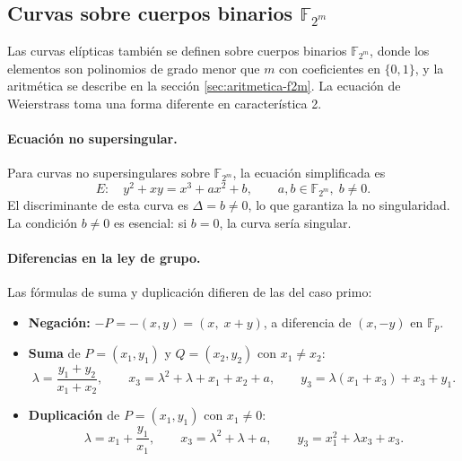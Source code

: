 \subsection{\texorpdfstring{Curvas sobre cuerpos binarios $\mathbb{F}_{2^m}$}{Curvas sobre cuerpos binarios F2m}}
\label{subsec:ecc-campos-binarios}

Las curvas elípticas también se definen sobre cuerpos binarios $\mathbb{F}_{2^m}$, donde los elementos son polinomios de grado menor que $m$ con coeficientes en $\{0, 1\}$, y la aritmética se describe en la sección \ref{sec:aritmetica-f2m}. La ecuación de Weierstrass toma una forma diferente en característica 2.

\paragraph{Ecuación no supersingular.}
Para curvas no supersingulares sobre $\mathbb{F}_{2^m}$, la ecuación simplificada es
\begin{equation}
\label{eq:weierstrass-binaria}
    E: \quad y^2 + xy = x^3 + ax^2 + b, \qquad a, b \in \mathbb{F}_{2^m},\; b \neq 0.
\end{equation}
El discriminante de esta curva es $\Delta = b \neq 0$, lo que garantiza la no singularidad. La condición $b \neq 0$ es esencial: si $b = 0$, la curva sería singular.

\paragraph{Diferencias en la ley de grupo.}
Las fórmulas de suma y duplicación difieren de las del caso primo:

\begin{itemize}
    \item \textbf{Negación:} $-P = -(x, y) = (x,\; x + y)$, a diferencia de $(x, -y)$ en $\mathbb{F}_p$.
    
    \item \textbf{Suma} de $P = (x_1, y_1)$ y $Q = (x_2, y_2)$ con $x_1 \neq x_2$:
    \[
        \lambda = \frac{y_1 + y_2}{x_1 + x_2}, \qquad
        x_3 = \lambda^2 + \lambda + x_1 + x_2 + a, \qquad
        y_3 = \lambda(x_1 + x_3) + x_3 + y_1.
    \]
    
    \item \textbf{Duplicación} de $P = (x_1, y_1)$ con $x_1 \neq 0$:
    \[
        \lambda = x_1 + \frac{y_1}{x_1}, \qquad
        x_3 = \lambda^2 + \lambda + a, \qquad
        y_3 = x_1^2 + \lambda x_3 + x_3.
    \]
\end{itemize}

